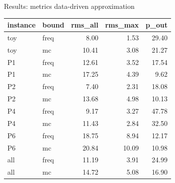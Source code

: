\documentclass[slides]{beamer}
\begin{document}
\begin{frame}{Results: metrics data-driven approximation}
    \begin{table}[ht]
        \label{tab:metrics-inst}
        \centering
        \begin{tabular}{llrrr}
            \hline
            instance & bound & rms\_all & rms\_max & p\_out \\
            \hline
            toy & freq & 8.00 & 1.53 & 29.40 \\
            toy & mc & 10.41 & 3.08 & 21.27 \\
            P1 & freq & 12.61 & 3.52 & 17.54 \\
            P1 & mc & 17.25 & 4.39 & 9.62 \\
            P2 & freq & 7.40 & 2.31 & 18.08 \\
            P2 & mc & 13.68 & 4.98 & 10.13 \\
            P4 & freq & 9.17 & 3.27 & 47.78 \\
            P4 & mc & 11.43 & 2.84 & 32.50 \\
            P6 & freq & 18.75 & 8.94 & 12.17 \\
            P6 & mc & 20.84 & 10.09 & 10.98 \\
            \hline
            all & freq & 11.19 & 3.91 & 24.99 \\
            all & mc & 14.72 & 5.08 & 16.90 \\
            \hline
        \end{tabular}
    \end{table}
\end{frame}
\end{document}
